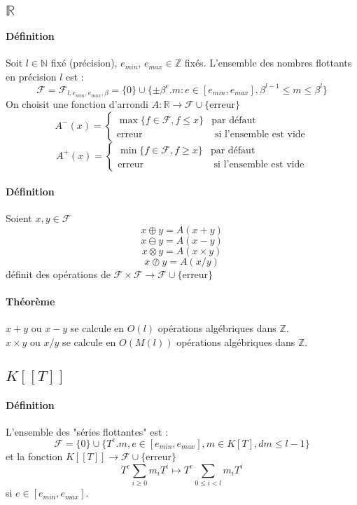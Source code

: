 \documentclass[12pt,a4paper]{report}
\begin{document}
\subsection{$\mathbb{R}$}
\paragraph{Définition\\}
Soit $l\in \mathbb{N}$ fixé (précision), $e_{min}$, $e_{max} \in \mathbb{Z} $ fixés. L'ensemble des nombres flottants en précision $l$ est :
$$ \mathcal{F}= \mathcal{F}_{l,e_{min},e_{max},\beta}=\{0\} \cup \{\pm \beta ^e . m : e\in [e_{min},e_{max}],\beta^{l-1}\leqslant m \leqslant \beta^l\}$$
On choisit une fonction d'arrondi $A:\mathbb{R} \rightarrow \mathcal{F} \cup \{\mbox{erreur}\}$
$$A^-(x)=\left\{\begin{array}{ll}
\max\{f\in \mathcal{F}, f \leqslant x\} & \mbox{par défaut} \\
\mbox{erreur} & \mbox{ si l'ensemble est vide} \end{array}\right.$$
$$A^+(x)=\left\{\begin{array}{ll}
\min\{f\in \mathcal{F}, f \geqslant x\} & \mbox{par défaut} \\
\mbox{erreur} & \mbox{ si l'ensemble est vide} \end{array}\right.$$
\paragraph{Définition\\}
Soient $x,y \in \mathcal{F}$
$$ x \oplus y=A(x+y)$$
$$  x \ominus y=A(x-y)$$
$$ x \otimes y=A(x\times y)$$
$$ x \oslash y=A(x/y)$$
définit des opérations de $\mathcal{F} \times \mathcal{F} \rightarrow \mathcal{F} \cup \{$erreur$\}$
\paragraph{Théorème\\}
$ x + y$ ou $x - y$ se calcule en $O(l)$ opérations algébriques dans $\mathbb{Z}$.\\
$x \times y $ ou $x / y $ se calcule en $O(M(l))$ opérations algébriques dans $\mathbb{Z}$.
\subsection{$K[[T]]$}
\paragraph{Définition\\}
L'ensemble des "séries flottantes" est :
$$ \mathcal{F}=\{0\} \cup \{T^e.m, e\in [e_{min},e_{max}], m \in K[T], d m \leqslant l-1\}$$
et la fonction $K[[T]] \rightarrow \mathcal{F} \cup \{$erreur$\}$
$$T^e \sum_{i\geqslant 0} m_i T^i \mapsto T^e \sum_{0 \leqslant i < l} m_i T^i$$ si $e\in [e_{min},e_{max}]$.
\end{document}
